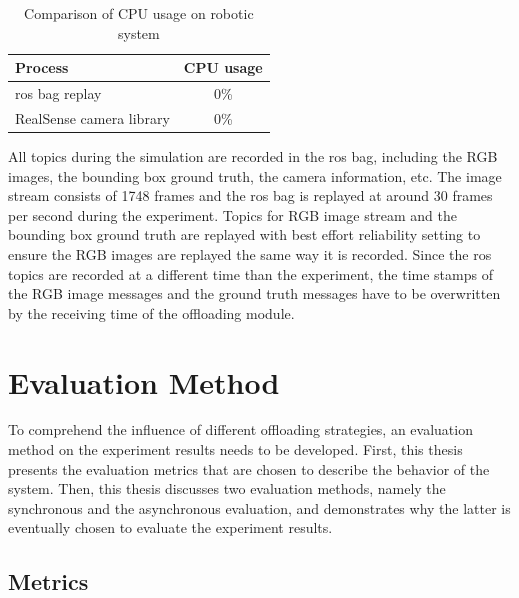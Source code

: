 \begin{table}[htp]
    \centering
    \begin{tabular}{lc}
    \toprule
    Process&                    CPU usage\\
    \midrule
    \gls{ros} bag replay&       0\%\\
    RealSense camera library&   0\%\\
    \bottomrule
    \end{tabular}
    \caption{Comparison of CPU usage on robotic system}
    \label{tab:ros_bag_comparison}
\end{table}

All topics during the simulation are recorded in the \gls{ros} bag, including the RGB images, the bounding box ground truth, the camera information, etc. The image stream consists of 1748 frames and the \gls{ros} bag is replayed at around 30 frames per second during the experiment. Topics for RGB image stream and the bounding box ground truth are replayed with best effort reliability setting to ensure the RGB images are replayed the same way it is recorded. Since the \gls{ros} topics are recorded at a different time than the experiment, the time stamps of the RGB image messages and the ground truth messages have to be overwritten by the receiving time of the offloading module.

\section{Evaluation Method}\label{sec:general_setup:evaluation}

To comprehend the influence of different offloading strategies, an evaluation method on the experiment results needs to be developed. First, this thesis presents the evaluation metrics that are chosen to describe the behavior of the system. Then, this thesis discusses two evaluation methods, namely the synchronous and the asynchronous evaluation, and demonstrates why the latter is eventually chosen to evaluate the experiment results.

\subsection{Metrics}


